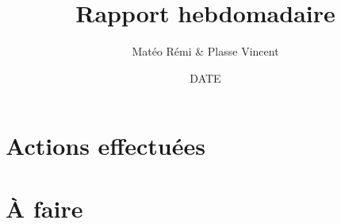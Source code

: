 \documentclass{article}
\title{Rapport hebdomadaire}
\author{Matéo Rémi \& Plasse Vincent}
\date{DATE}
\begin{document}
\maketitle

\section{Actions effectuées}



\section{À faire}
\end{document}
